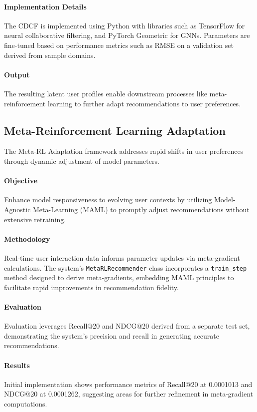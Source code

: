\documentclass{article} %
\begin{document}
\paragraph{Implementation Details}
The CDCF is implemented using Python with libraries such as TensorFlow for neural collaborative filtering, and PyTorch Geometric for GNNs. Parameters are fine-tuned based on performance metrics such as RMSE on a validation set derived from sample domains.

\paragraph{Output}
The resulting latent user profiles enable downstream processes like meta-reinforcement learning to further adapt recommendations to user preferences.

\subsection{Meta-Reinforcement Learning Adaptation}

The Meta-RL Adaptation framework addresses rapid shifts in user preferences through dynamic adjustment of model parameters.

\paragraph{Objective}
Enhance model responsiveness to evolving user contexts by utilizing Model-Agnostic Meta-Learning (MAML) to promptly adjust recommendations without extensive retraining.

\paragraph{Methodology}
Real-time user interaction data informs parameter updates via meta-gradient calculations. The system's \texttt{MetaRLRecommender} class incorporates a \texttt{train\_step} method designed to derive meta-gradients, embedding MAML principles to facilitate rapid improvements in recommendation fidelity.

\paragraph{Evaluation}
Evaluation leverages Recall@20 and NDCG@20 derived from a separate test set, demonstrating the system's precision and recall in generating accurate recommendations.

\paragraph{Results}
Initial implementation shows performance metrics of Recall@20 at 0.0001013 and NDCG@20 at 0.0001262, suggesting areas for further refinement in meta-gradient computations.
\end{document}
